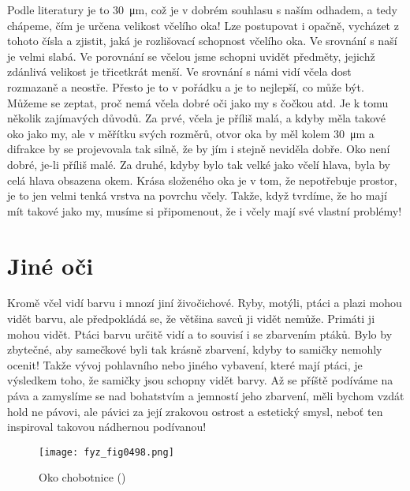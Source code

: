     Podle literatury je to \qty{30}{\micro\m}, což je v dobrém souhlasu s naším odhadem, a tedy
    chápeme, čím je určena velikost včelího oka! Lze postupovat i opačně, vycházet z tohoto čísla a
    zjistit, jaká je rozlišovací schopnost včelího oka. Ve srovnání s naší je velmi slabá. Ve
    porovnání se včelou jsme schopni uvidět předměty, jejichž zdánlivá velikost je třicetkrát menší.
    Ve srovnání s námi vidí včela dost rozmazaně a neostře. Přesto je to v pořádku a je to nejlepší,
    co může být. Můžeme se zeptat, proč nemá včela dobré oči jako my s čočkou atd. Je k tomu několik
    zajímavých důvodů. Za prvé, včela je příliš malá, a kdyby měla takové oko jako my, ale v měřítku
    svých rozměrů, otvor oka by měl kolem \qty{30}{\micro\m} a difrakce by se projevovala tak silně,
    že by jím i stejně neviděla dobře. Oko není dobré, je-li příliš malé. Za druhé, kdyby bylo tak
    velké jako včelí hlava, byla by celá hlava obsazena okem. Krása složeného oka je v tom, že
    nepotřebuje prostor, je to jen velmi tenká vrstva na povrchu včely. Takže, když tvrdíme, že ho
    mají mít takové jako my, musíme si připomenout, že i včely mají své vlastní problémy!

  \section{Jiné oči}\label{fyz:IchapXXXVIsecV}
    Kromě včel vidí barvu i mnozí jiní živočichové. Ryby, motýli, ptáci a plazi mohou vidět barvu,
    ale předpokládá se, že většina savců ji vidět nemůže. Primáti ji mohou vidět. Ptáci barvu určitě
    vidí a to souvisí i se zbarvením ptáků. Bylo by zbytečné, aby samečkové byli tak krásně
    zbarvení, kdyby to samičky nemohly ocenit! Takže vývoj pohlavního nebo jiného vybavení, které
    mají ptáci, je výsledkem toho, že samičky jsou schopny vidět barvy. Až se příště podíváme na
    páva a zamyslíme se nad bohatstvím a jemností jeho zbarvení, měli bychom vzdát hold ne pávovi,
    ale pávici za její zrakovou ostrost a estetický smysl, neboť ten inspiroval takovou nádhernou
    podívanou!

    \begin{figure}[ht!] %
      \centering
      \texttt{[image: fyz\_fig0498.png]}
      \caption{Oko chobotnice (\cite[s.~697]{Feynman01})}
      \label{fyz:fig0498}
    \end{figure}

